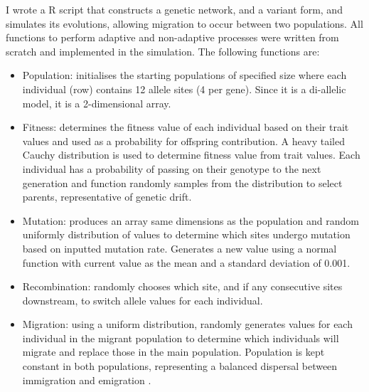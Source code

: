 I wrote a R script that constructs a genetic network, and a variant form, and simulates its evolutions, allowing migration to occur between two populations. All functions to perform adaptive and non-adaptive processes were written from scratch and implemented in the simulation. The following functions are:
\begin{itemize}
    \item Population: initialises the starting populations of specified size where each individual (row) contains 12 allele sites (4 per gene). Since it is a di-allelic model, it is a 2-dimensional array.
    \item Fitness: determines the fitness value of each individual based on their trait values and used as a probability for offspring contribution. A heavy tailed Cauchy distribution is used to determine fitness value from trait values. Each individual has a probability of passing on their genotype to the next generation and function randomly samples from the distribution to select parents, representative of genetic drift.
    \item Mutation: produces an array same dimensions as the population and random uniformly distribution of values to determine which sites undergo mutation based on inputted mutation rate. Generates a new value using a normal function with current value as the mean and a standard deviation of 0.001.
    \item Recombination: randomly chooses which site, and if any consecutive sites downstream, to switch allele values for each individual.
    \item Migration: using a uniform distribution, randomly generates values for each individual in the migrant population to determine which individuals will migrate and replace those in the main population. Population is kept constant in both populations, representing a balanced dispersal between immigration and emigration \cite{rice2009evolution,w2004dispersal}.
\end{itemize}
